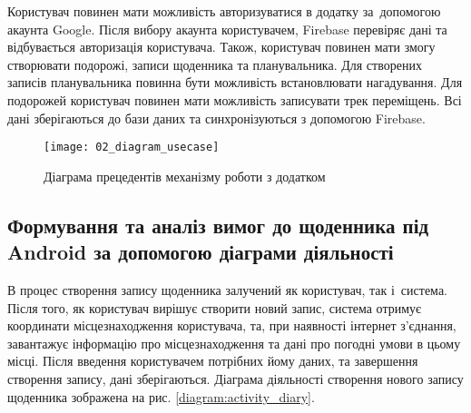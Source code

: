 \documentclass[../main.tex]{subfiles}
\begin{document}
Користувач повинен мати можливість авторизуватися в додатку за~допомогою акаунта Google. Після вибору акаунта користувачем, Firebase перевіряє дані та відбувається авторизація користувача. Також, користувач повинен мати змогу створювати подорожі, записи щоденника та планувальника. Для створених записів планувальника повинна бути можливість встановлювати нагадування. Для подорожей користувач повинен мати можливість записувати трек переміщень. Всі дані зберігаються до бази даних та синхронізуються з допомогою Firebase.

\begin{figure}[H]
	\centering
	\texttt{[image: 02\_diagram\_usecase]}
	\caption{Діаграма прецедентів механізму роботи з додатком}
	\label{diagram:usecase}
\end{figure}


\subsection{Формування та аналіз вимог до щоденника  під Android за допомогою діаграми діяльності}
%


В процес створення запису щоденника залучений як користувач, так і~система. Після того, як користувач вирішує створити новий запис, система отримує координати місцезнаходження користувача, та, при наявності інтернет з'єднання, завантажує інформацію про місцезнаходження та дані про погодні умови в цьому місці. Після введення користувачем потрібних йому даних, та завершення створення запису, дані зберігаються. Діаграма діяльності створення нового запису щоденника зображена на рис. \ref{diagram:activity_diary}.
\end{document}
